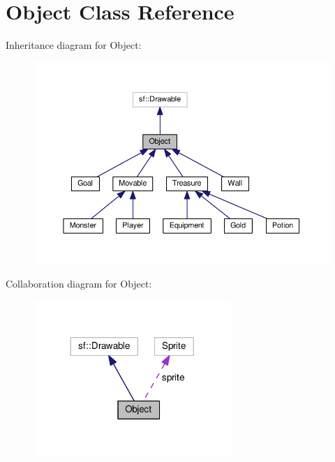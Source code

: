 \hypertarget{classObject}{\section{Object Class Reference}
\label{classObject}
}


Inheritance diagram for Object\+:
\nopagebreak
\begin{figure}[H]
\begin{center}
\leavevmode
\includegraphics[width=350pt]{classObject__inherit__graph}
\end{center}
\end{figure}


Collaboration diagram for Object\+:
\nopagebreak
\begin{figure}[H]
\begin{center}
\leavevmode
\includegraphics[width=212pt]{classObject__coll__graph}
\end{center}
\end{figure}
